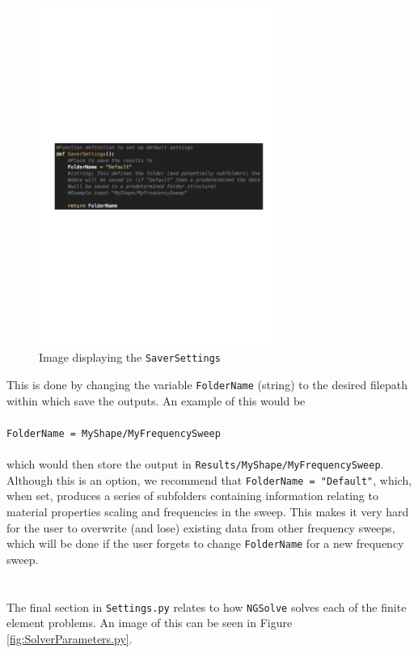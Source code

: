 \begin{figure}[H]
\begin{center}
\includegraphics[width=0.7\textwidth]{Figures/SaverSettings}
\caption{Image displaying the \texttt{SaverSettings}}\label{fig:SaverSettings.py}
\end{center}
\end{figure}
\noindent
This is done by changing the variable \texttt{FolderName} (string) to the desired filepath within which save the outputs. An example of this would be\\
\\
\texttt{FolderName = MyShape/MyFrequencySweep}\\
\\
which would then store the output in \texttt{Results/MyShape/MyFrequencySweep}. Although this is an option, we recommend that \texttt{FolderName = "Default"}, which, when set, produces a series of subfolders containing information relating to material properties scaling and frequencies in the sweep. This makes it very hard for the user to overwrite (and lose) existing data from other frequency sweeps, which will be done if the user forgets to change \texttt{FolderName} for a new frequency sweep.\\
\\
\\
\noindent
The final section in \texttt{Settings.py} relates to how \texttt{NGSolve} solves each of the finite element problems. An image of this can be seen in Figure \ref{fig:SolverParameters.py}.
